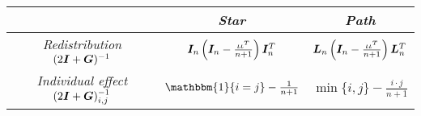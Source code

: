 \renewcommand{\arraystretch}{1.5}

\vspace{5mm}
\begin{tabular}{c || c | c }
                                                      & \textit{Star}                                                & \textit{Path}                                                             \\
  \midrule
  \textit{Redistribution} $(2\bm{I} + \bm{G})^{-1}$           & $\bm{I}_n \left( \bm{I}_n - \frac{\iota \iota^T}{n+1} \right)\bm{I}_n^T$ & $\bm{L}_n \left( \bm{I}_n - \frac{\iota \iota^T}{n+1} \right) \bm{L}_n^T$ \\
  \midrule
  \textit{Individual effect} $(2\bm{I} + \bm{G})^{-1}_{i, j}$ & $\mathbbm{1}\{i = j\} - \frac{1}{n+1}$                       & $\min\{i, j\} - \frac{i \cdot j}{n+1}$
\end{tabular}
\vspace{5mm}
